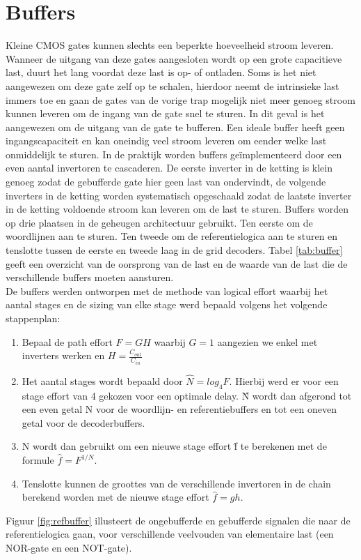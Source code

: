 \section{Buffers}
Kleine CMOS gates kunnen slechts een beperkte hoeveelheid stroom leveren. Wanneer de uitgang van deze gates aangesloten wordt op een grote capacitieve last, duurt het lang voordat deze last is op- of ontladen. Soms is het niet aangewezen om deze gate zelf op te schalen, hierdoor neemt de intrinsieke last immers toe en gaan de gates van de vorige trap mogelijk niet meer genoeg stroom kunnen leveren om de ingang van de gate snel te sturen. In dit geval is het aangewezen om de uitgang van de gate te bufferen. Een ideale buffer heeft geen ingangscapaciteit en kan oneindig veel stroom leveren om eender welke last onmiddelijk te sturen. In de praktijk worden buffers geïmplementeerd door een even aantal invertoren te cascaderen. De eerste inverter in de ketting is klein genoeg zodat de gebufferde gate hier geen last van ondervindt, de volgende inverters in de ketting worden systematisch opgeschaald zodat de laatste inverter in de ketting voldoende stroom kan leveren om de last te sturen. 
Buffers worden op drie plaatsen in de geheugen architectuur gebruikt. Ten eerste om de woordlijnen aan te sturen. Ten tweede om de referentielogica aan te sturen en tenslotte  tussen de eerste en tweede laag in de grid decoders. Tabel \ref{tab:buffer} geeft een overzicht van de oorsprong van de last en de waarde van de last die de verschillende buffers moeten aansturen.\\
De buffers werden ontworpen met de methode van logical effort\cite{Sutherland:1999:LED:298513} waarbij het aantal stages en de sizing van elke stage werd bepaald volgens het volgende stappenplan:
\begin{enumerate}
\item Bepaal de path effort $F = GH$ waarbij $G = 1$ aangezien we enkel met inverters werken en $H = \frac{C_{out}}{C_{in}}$
\item Het aantal stages wordt bepaald door $\hat{N} = log_{4}F$. Hierbij werd er voor een stage effort van 4 gekozen voor een optimale delay. \^{N} wordt dan afgerond tot een even getal N voor de woordlijn- en referentiebuffers en tot een oneven getal voor de decoderbuffers.
\item N wordt dan gebruikt om een nieuwe stage effort \^{f} te berekenen met de formule $\hat{f} = F^{1/N}$.
\item Tenslotte kunnen de groottes van de verschillende invertoren in de chain berekend worden met de nieuwe stage effort $\hat{f} = gh$.
\end{enumerate}
Figuur \ref{fig:refbuffer} illusteert de ongebufferde en gebufferde signalen die naar de referentielogica gaan, voor verschillende veelvouden van elementaire last (een NOR-gate en een NOT-gate).

